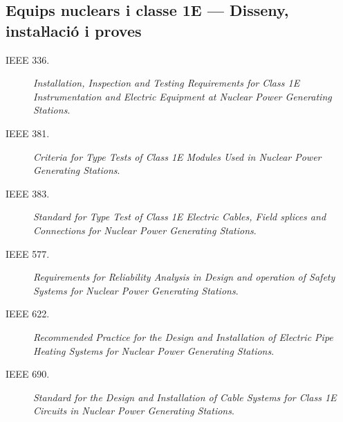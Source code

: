 \subsection*{Equips nuclears i classe 1E --- Disseny, instaŀlació i proves}
\begin{description}
    \item [\hspace{5mm}IEEE 336.] \textit{Installation, Inspection and Testing Requirements for Class 1E Instrumentation and Electric Equipment at Nuclear Power Generating Stations}.
     \item [\hspace{5mm}IEEE 381.] \textit{Criteria for Type Tests of Class 1E Modules Used in Nuclear Power Generating Stations}.
    \item [\hspace{5mm}IEEE 383.] \textit{Standard for Type Test of Class 1E Electric Cables, Field splices and Connections for Nuclear Power Generating Stations}.
    \item [\hspace{5mm}IEEE 577.] \textit{Requirements for Reliability Analysis in Design and operation of Safety Systems for Nuclear Power Generating Stations}.
    \item [\hspace{5mm}IEEE 622.] \textit{Recommended Practice for the Design and Installation of Electric Pipe Heating Systems for Nuclear Power Generating Stations}.
    \item [\hspace{5mm}IEEE 690.] \textit{Standard for the Design and Installation of Cable Systems for Class 1E Circuits in Nuclear Power Generating Stations}.
\end{description}


